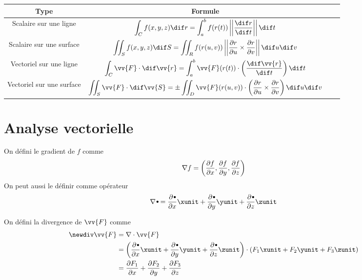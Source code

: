 \begin{center}
	\begin{tabular}{|S c|S c|}
		\hline
		\textbf{Type} & \textbf{Formule} \\
		\hline
		Scalaire sur une ligne & $\displaystyle \int_C f(x,y,z) \dif r = \int_a^b f(r(t)) \left|\left| \frac{\dif r}{\dif t} \right| \right| \dif t$ \\
		\hline
		Scalaire sur une surface & $\displaystyle \iint_S f(x,y,z) \dif S = \iint_R f(r(u,v)) \left| \left| \frac{\pa r}{\pa u} \times \frac{\pa r}{\pa v} \right| \right| \dif u \dif v $ \\
		\hline
		Vectoriel sur une ligne & $ \displaystyle \int_C \vv{F} \cdot \dif \vv{r} = \int_a^b \vv{F}(r(t)) \cdot \left(  \frac{\dif \vv{r}}{\dif t} \right) \dif t $ \\
		\hline
		Vectoriel sur une surface & $ \displaystyle \iint_S \vv{F} \cdot \dif \vv{S} = \pm \iint_D \vv{F}(r(u,v)) \cdot \left( \frac{\pa r}{\pa u} \times \frac{\pa r}{\pa v} \right) \dif u \dif v $ \\
		\hline
	\end{tabular}
\end{center}

\section{Analyse vectorielle}

\begin{mydef}[Gradient] On défini le gradient de $f$ comme
	\[ \nabla f = \left( \frac{\partial f}{\partial x} , \frac{\partial f}{\partial y} , \frac{\partial f}{\partial z} \right) \]
	On peut aussi le définir comme opérateur
	\[ \nabla \sbt =
	\frac{\pa \sbt}{\pa x} \xunit + \frac{\pa \sbt}{\pa y} \yunit + \frac{\pa \sbt}{\pa z} \zunit \]
\end{mydef}

\begin{mydef}[Divergence] On défini la divergence de $\vv{F}$ comme
	\begin{align*} \newdiv \vv{F} & = \nabla \cdot \vv{F} \\
		& = \left( \frac{\pa \sbt}{\pa x} \xunit + \frac{\pa \sbt}{\pa y} \yunit + \frac{\pa \sbt}{\pa z} \zunit \right) \cdot \left( F_1 \xunit + F_2 \yunit + F_3 \zunit \right) \\
		& = \frac{\pa F_1}{\pa x} + \frac{\pa F_2}{\pa y} + \frac{\pa F_3}{\pa z} \\
	\end{align*}
\end{mydef}

